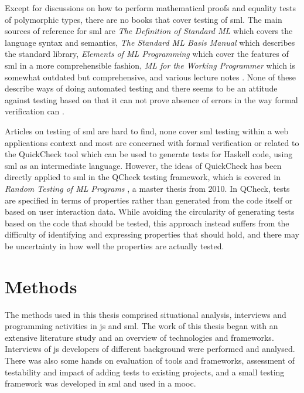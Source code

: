 \documentclass[11pt]{article}
\begin{document}
Except for discussions on how to perform mathematical proofs and equality tests of polymorphic types, there are no books that cover testing of \gls{sml}. The main sources of reference for \gls{sml} are \emph{The Definition of Standard ML} \cite{DefinitionStandardML} which covers the language syntax and semantics, \emph{The Standard ML Basis Manual} \cite{BasisManual} which describes the standard library, \emph{Elements of ML Programming} \cite{ElementsML} which cover the features of \gls{sml} in a more comprehensible fashion, \emph{ML for the Working Programmer} \cite{WorkingProgrammer} which is somewhat outdated but comprehensive, and various lecture notes \cite{ProgSml97}\cite{ProgSmlHarper}\cite{FunctionalML}\cite{NotesSMLNJ}. None of these describe ways of doing automated testing and there seems to be an attitude against testing based on that it can not prove absence of errors in the way formal verification can \cite[p.~16]{ProgSmlHarper}.

Articles on testing of \gls{sml} are hard to find, none cover \gls{sml} testing within a web applications context and most are concerned with formal verification or related to the QuickCheck tool which can be used to generate tests for Haskell code, using \gls{sml} as an intermediate language. However, the ideas of QuickCheck has been directly applied to \gls{sml} in the QCheck testing framework, which is covered in \emph{Random Testing of ML Programs} \cite{RandomML}, a master thesis from 2010. In QCheck, tests are specified in terms of properties rather than generated from the code itself or based on user interaction data. While avoiding the circularity of generating tests based on the code that should be tested, this approach instead suffers from the difficulty of identifying and expressing properties that should hold, and there may be uncertainty in how well the properties are actually tested.


\section{Methods}
\label{sec:methods}

The methods used in this thesis comprised situational analysis, interviews and programming activities in \gls{js} and \gls{sml}. The work of this thesis began with an extensive literature study and an overview of technologies and frameworks. Interviews of \gls{js} developers of different background were performed and analysed. There was also some hands on evaluation of tools and frameworks, assessment of testability and impact of adding tests to existing projects, and a small testing framework was developed in \gls{sml} and used in a \gls{mooc}.
\end{document}
